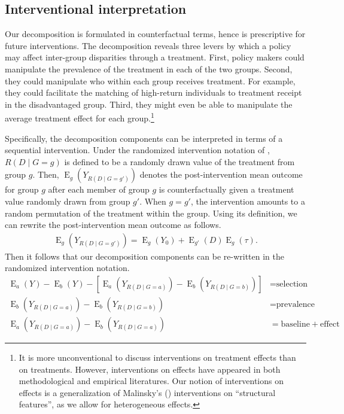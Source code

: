 \documentclass[12pt,a4paper]{article}
\newcommand{\E}{\operatorname{E}}
\begin{document}
\subsection{Interventional interpretation}
Our decomposition is formulated in counterfactual terms, hence is prescriptive for future interventions. The decomposition reveals three levers by which a policy may affect inter-group disparities through a treatment. First, policy makers could manipulate the prevalence of the treatment in each of the two groups. Second, they could manipulate who within each group receives treatment. For example, they could facilitate the matching of high-return individuals to treatment receipt in the disadvantaged group. Third, they might even be able to manipulate the average treatment effect for each group.\footnote{It is more unconventional to discuss interventions on treatment effects than on treatments. However, interventions on effects have appeared in both methodological \citep{malinsky_intervening_2018, diderichsen_differential_2019} and empirical \citep{brady_rethinking_2017} literatures.
Our notion of interventions on effects is a generalization of Malinsky's (\citeyear{malinsky_intervening_2018}) interventions on ``structural features'', as we allow for heterogeneous effects.} 

Specifically, the decomposition components can be interpreted in terms of a sequential intervention. Under the randomized intervention notation of \citet{didelez_direct_2006}, $R(D \mid  G=g)$ is defined to be a randomly drawn value of the treatment from group $g$. Then, $\E_g \left(Y_{R(D \mid  G=g') } \right)$ denotes the post-intervention mean outcome for group $g$ after each member of group $g$ is counterfactually given a treatment value randomly drawn from  group $g'$. When $g=g'$, the intervention amounts to a random permutation of the treatment within the group. Using its definition, we can rewrite the post-intervention mean outcome as follows.
\begin{align}
    \E_g \left(Y_{R(D \mid  G=g') } \right) = \E_g (Y_0) + \E_{g'}(D)\E_g(\tau). \label{eqt2}
\end{align}
Then it follows that our decomposition components can be re-written in the randomized intervention notation.
\begin{align*}
   \E_a(Y) - \E_b(Y) - \left[ \E_a \left(Y_{R(D \mid G=a)} \right) - \E_b \left(Y_{R(D \mid G=b)}\right) \right] &= \text{selection} \\
   \E_b \left(Y_{R(D \mid G=a)} \right)-\E_b \left(Y_{R(D \mid G=b)} \right)  &= \text{prevalence} \\
   \E_a \left(Y_{R(D \mid G=a)} \right)-\E_b \left(Y_{R(D \mid G=a)} \right)  &= \text{baseline} + \text{effect} 
\end{align*}
\end{document}
